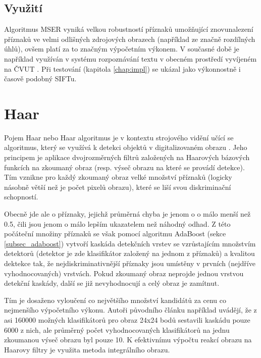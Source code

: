 	\subsection{Využití}
		Algoritmus MSER vyniká velkou robustností příznaků umožňující znovunalezení příznaků ve velmi odlišných zdrojových obrazech (například ze značně rozdílných úhlů), ovšem platí za to značným výpočetním výkonem. V současné době je například využíván v systému rozpoznávání textu v obecném prostředí vyvíjeném na ČVUT \cite{neumann2012real}. Při testování (kapitola \ref{chap:impl}) se ukázal jako výkonnostně i časově podobný SIFTu.
	

\section{Haar}


	Pojem Haar nebo Haar algoritmus je v kontextu strojového vidění učící se algoritmus, který se využívá k detekci objektů v digitalizovaném obrazu \cite{viola2001rapid}. Jeho principem je aplikace dvojrozměrných filtrů založených na Haarových bázových funkcích na zkoumaný obraz (resp. výseč obrazu na které se provádí detekce). Tím vznikne pro každý zkoumaný obraz velké množství příznaků (logicky násobně větší než je počet pixelů obrazu), které se liší svou diskriminační schopností. 
	
	Obecně jde ale o příznaky, jejichž průměrná chyba je jenom o o málo menší než 0.5, čili jsou jenom o málo lepším ukazatelem než náhodný odhad. Z této počáteční množiny příznaků se však pomocí algoritmu AdaBoost (sekce \ref{subsec_adaboost}) vytvoří kaskáda detekčních vrstev se vzrůstajícím množstvím detektorů (detektor je zde klasifikátor založený na jednom z příznaků) a kvalitou dektekce tak, že nejdiskriminativnější příznaky jsou umístěny v prvních (nejdříve vyhodnocovaných) vrstvách. Pokud zkoumaný obraz neprojde jednou vrstvou detekční kaskády, další se již nevyhodnocují a celý obraz je zamítnut. 
	
	Tím je dosaženo vyloučení co největšího množství kandidátů za cenu co nejmenšího výpočetního výkonu. Autoři původního článku například uvádějí, že z asi 160000 možných klasifikátorů pro obraz 24x24 bodů sestavili kaskádu pouze 6000 z nich, ale průměrný počet vyhodnocovaných klasifikátorů na jednu zkoumanou výseč obrazu byl pouze 10. K efektivnímu výpočtu reakcí obrazu na Haarovy filtry je využita metoda integrálního obrazu.
	
